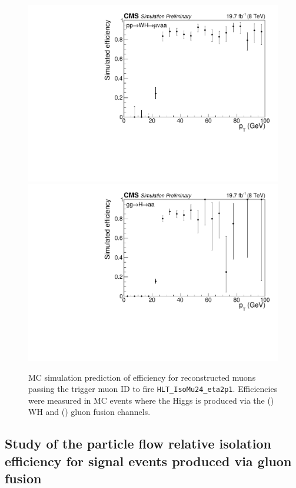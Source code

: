 \begin{figure}[hbtp]
  \begin{center}
    \includegraphics[width=1.24\cmsFigWidth]{figures/HLT_eff_Wmu_WH}
    \includegraphics[width=1.24\cmsFigWidth]{figures/HLT_eff_Wmu_ggH}
    \caption{MC simulation prediction of efficiency for reconstructed muons passing the trigger muon ID to fire \texttt{HLT\_IsoMu24\_eta2p1}. Efficiencies were measured in MC events where the Higgs is produced via the (\cmsLeft) WH and (\cmsRight) gluon fusion channels.}
    \label{fig:HLT-eff-W-mu}
  \end{center}
\end{figure}

\subsection{Study of the particle flow relative isolation efficiency for signal events produced via gluon fusion\label{sec:muon-id-eff-iso}}

